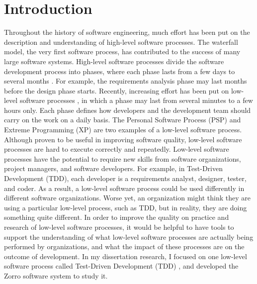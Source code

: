 \chapter{Introduction}
\label{ch:Introduction}
Throughout the history of software engineering, much effort has been put on the description and understanding of high-level software processes. The waterfall model, the very first software process, has contributed to the success of many large software systems. High-level software processes divide the software development process into phases, where each phase lasts from a few days to several months \cite{Pfleeger:01,Pressman:03}. For example, the requirements analysis phase may last months before the design phase starts. Recently, increasing effort has been put on low-level software processes \cite{Larman:03,AgileAlliance}, in which a phase may last from several minutes to a few hours only. Each phase defines how developers and the development team should carry on the work on a daily basis. The Personal Software Process (PSP) \cite{Humphrey:99} and Extreme Programming (XP) \cite{Jeffries:00,Beck:00,XP96} are two examples of a low-level software process. Although proven to be useful in improving software quality\cite{Ferguson:97,Kamatar:00,MicrosoftTSP,Janzen:05}, low-level software processes are hard to execute correctly and repeatedly. Low-level software processes have the potential to require new skills from software organizations, project managers, and software developers. For example, in Test-Driven Development (TDD), each developer is a requirements analyst, designer, tester, and coder. As a result, a low-level software process could be used differently in different software organizations. Worse yet, an organization might think they are using a particular low-level process, such as TDD, but in reality, they are doing something quite different. In order to improve the quality on practice and research of low-level software processes, it would be helpful to have tools to support the understanding of what low-level software processes are actually being performed by organizations, and what the impact of these processes are on the outcome of development. In my dissertation research, I focused on one low-level software process called Test-Driven Development (TDD) \cite{Beck:03}, and developed the Zorro software system to study it.

